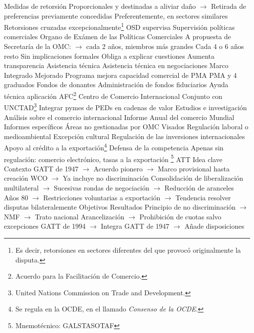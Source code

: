 \documentclass{nuevotema}
\begin{document}
\begin{esquemal}
				\4[8] Medidas de retorsión
				\4[] Proporcionales y destinadas a aliviar daño
				\4[] $\to$ Retirada de preferencias previamente concedidas
				\4[] Preferentemente, en sectores similares
				\4[] Retorsiones cruzadas excepcionalmente\footnote{Es decir, retorsiones en sectores diferentes del que provocó originalmente la disputa.}
				\4[] OSD supervisa
			\3 Supervisión políticas comerciales
				\4 Organo de Exámen de las Políticas Comerciales
				\4 A propuesta de Secretaría de la OMC:
				\4[] $\to$ cada 2 años, miembros más grandes
				\4[] Cada 4 o 6 años resto
				\4 Sin implicaciones formales
				\4[] Obliga a explicar cuestiones
				\4[] Aumenta transparencia
			\3 Asistencia técnica
				\4 Asistencia técnica en negociaciones
				\4 Marco Integrado Mejorado
				\4[] Programa mejora capacidad comercial de PMA
				 PMA y 4 graduados
				\4[] Fondos de donantes
				\4 Administración de fondos fiduciarios
				\4 Ayuda técnica aplicación AFC\footnote{Acuerdo para la Facilitación de Comercio.}
				\4 Centro de Comercio Internacional
				\4[] Conjunto con UNCTAD\footnote{United Nations Commission on Trade and Development.}
				\4[] Integrar pymes de PEDs en cadenas de valor
			\3 Estudios e investigación
				\4 Análisis sobre el comercio internacional
				\4 Informe Anual del comercio Mundial
				\4 Informes específicos
			\3 Áreas no gestionadas por OMC
				\4 Visados
				\4 Regulación laboral o medioambiental
				\4 Excepción cultural
				\4 Regulación de las inversiones internacionales
				\4 Apoyo al crédito a la exportación\footnote{Se regula en la OCDE, en el llamado \textit{Consenso de la OCDE}.}
				\4 Defensa de la competencia
				\4 Apenas sin regulación:
				\4[] comercio electrónico, tasas a la exportación
	\1 \footnote{Mnemotécnico: GALSTASOTAF}
		\2 ATT
			\3 Idea clave
				\4 Contexto
				\4[] GATT de 1947
				\4[] $\to$ Acuerdo pionero
				\4[] $\to$ Marco provisional hasta creación WCO
				\4[] $\to$ Ya incluye no discriminación
				\4[] Consolidación de liberalización multilateral
				\4[] $\to$ Sucesivas rondas de negociación
				\4[] $\to$ Reducción de aranceles
				\4[] Años 80
				\4[] $\to$ Restricciones voluntarias a exportación
				\4[] $\to$ Tendencia resolver disputas bilateralemente
				\4 Objetivos
				\4 Resultados
				\4[] Principio de no discriminación
				\4[] $\to$ NMF
				\4[] $\to$ Trato nacional
				\4[] Arancelización
				\4[] $\to$ Prohibición de cuotas salvo excepciones
				\4[] GATT de 1994
				\4[] $\to$ Integra GATT de 1947
				\4[] $\to$ Añade disposiciones

\end{esquemal}
\end{document}
